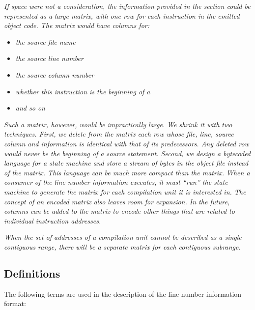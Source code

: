 \textit{If space were not a consideration, the information provided
in the  
section could be represented as a large
matrix, with one row for each instruction in the emitted
object code. The matrix would have columns for:}
\begin{itemize}
\item \textit{the source file name}
\item \textit{the source line number}
\item \textit{the source column number}
\item \textit{whether this instruction is the beginning of a }
\item \textit{and so on}
\end{itemize}
\textit{Such a matrix, however, would be impractically large. We
shrink it with two techniques. First, we delete from
the matrix each row whose file, line, source column and
 information 
is identical with that of its
predecessors. Any deleted row would never be the beginning of
a source statement. Second, we design a byte\dash coded language
for a state machine and store a stream of bytes in the object
file instead of the matrix. This language can be much more
compact than the matrix. When a consumer of the line number
information executes, it must ``run'' the state machine
to generate the matrix for each compilation unit it is
interested in.  The concept of an encoded matrix also leaves
room for expansion. In the future, columns can be added to the
matrix to encode other things that are related to individual
instruction addresses.}

\textit{When the set of addresses of a compilation unit cannot be
described as a single contiguous range, there will be a
separate matrix for each contiguous subrange.}

\subsection{Definitions}

The following terms are used in the description of the line
number information format:


